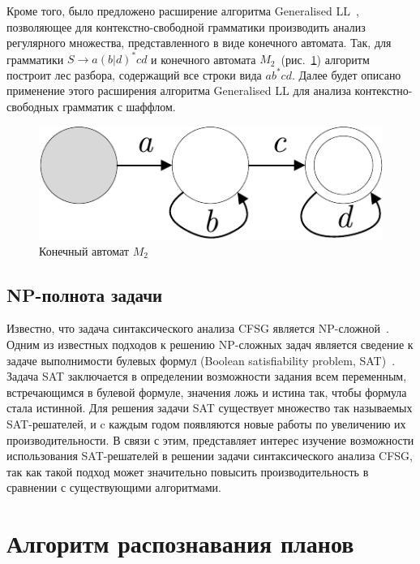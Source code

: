 \documentclass[14pt]{matmex-diploma-custom}
\begin{document}
    Кроме того, было предложено расширение алгоритма Generalised LL~\cite{ragozina}, позволяющее для контекстно-свободной
    грамматики производить анализ регулярного множества, представленного в виде конечного автомата. Так, для грамматики
    $S \rightarrow a(b|d)^*cd$ 
    и конечного автомата $M_2$~(рис.~\ref{fig:M2Aut}) алгоритм построит лес разбора, содержащий все строки вида $a b^* cd$.
    Далее будет описано применение этого расширения алгоритма Generalised LL для анализа контекстно-свободных грамматик с шаффлом.
    \begin{figure}[ht]
    	\centering
    	\includegraphics[scale=.6]{pictures/M2Automaton.pdf}
    	\caption{Конечный автомат $M_2$}
    	\label{fig:M2Aut}
    \end{figure}

    \subsection{NP-полнота задачи}
    
    Известно, что задача синтаксического анализа CFSG является NP-сложной~\cite{BERGLUND20131}.
    Одним из известных подходов к решению NP-сложных задач является сведение к задаче выполнимости булевых формул
    (Boolean satisfiability problem, SAT)~\cite{satSolvers}. Задача SAT заключается в определении 
    возможности задания всем переменным, встречающимся в булевой формуле, значения ложь и истина так,
    чтобы формула стала истинной. Для решения
    задачи SAT существует множество так называемых SAT-решателей, и c каждым годом появляются новые работы по увеличению
    их производительности. В связи с этим, представляет интерес изучение возможности использования SAT-решателей в решении задачи
    синтаксического анализа CFSG, так как такой подход может значительно повысить производительность в сравнении с существующими алгоритмами.
    
    \section{Алгоритм распознавания планов}
    
\end{document}
